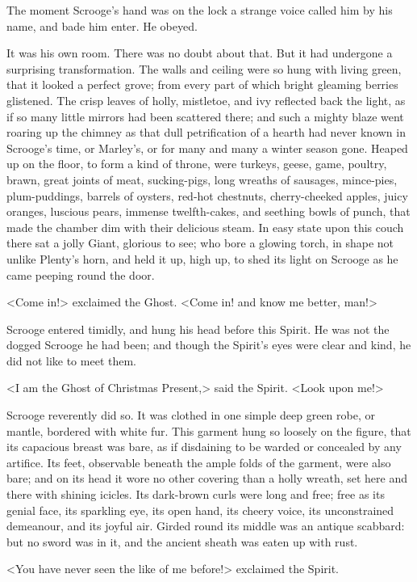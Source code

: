The moment Scrooge's hand was on the lock a strange voice called him by his name, and bade him enter. He obeyed.

It was his own room. There was no doubt about that. But it had undergone a surprising transformation. The walls and ceiling were so hung with living green, that it looked a perfect grove; from every part of which bright gleaming berries glistened. The crisp leaves of holly, mistletoe, and ivy reflected back the light, as if so many little mirrors had been scattered there; and such a mighty blaze went roaring up the chimney as that dull petrification of a hearth had never known in Scrooge's time, or Marley's, or for many and many a winter season gone. Heaped up on the floor, to form a kind of throne, were turkeys, geese, game, poultry, brawn, great joints of meat, sucking-pigs, long wreaths of sausages, mince-pies, plum-puddings, barrels of oysters, red-hot chestnuts, cherry-cheeked apples, juicy oranges, luscious pears, immense twelfth-cakes, and seething bowls of punch, that made the chamber dim with their delicious steam. In easy state upon this couch there sat a jolly Giant, glorious to see; who bore a glowing torch, in shape not unlike Plenty's horn, and held it up, high up, to shed its light on Scrooge as he came peeping round the door.

<Come in!> exclaimed the Ghost. <Come in! and know me better, man!>

Scrooge entered timidly, and hung his head before this Spirit. He was not the dogged Scrooge he had been; and though the Spirit's eyes were clear and kind, he did not like to meet them.

<I am the Ghost of Christmas Present,> said the Spirit. <Look upon me!>

Scrooge reverently did so. It was clothed in one simple deep green robe, or mantle, bordered with white fur. This garment hung so loosely on the figure, that its capacious breast was bare, as if disdaining to be warded or concealed by any artifice. Its feet, observable beneath the ample folds of the garment, were also bare; and on its head it wore no other covering than a holly wreath, set here and there with shining icicles. Its dark-brown curls were long and free; free as its genial face, its sparkling eye, its open hand, its cheery voice, its unconstrained demeanour, and its joyful air. Girded round its middle was an antique scabbard: but no sword was in it, and the ancient sheath was eaten up with rust.

<You have never seen the like of me before!> exclaimed the Spirit.

